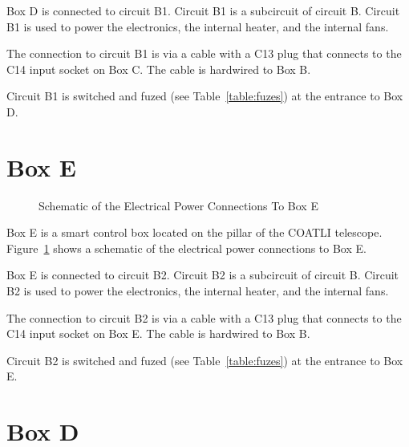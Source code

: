 Box D is connected to circuit B1. Circuit B1 is a subcircuit of circuit B. Circuit B1 is used to power the electronics, the internal heater, and the internal fans.

The connection to circuit B1 is via a cable with a C13 plug that connects to the C14 input socket on Box C. The cable is hardwired to Box B.

Circuit B1 is switched and fuzed (see Table~\ref{table:fuzes}) at the entrance to Box D.

\section{Box E}

\begin{figure}
\begin{center}
\footnotesize 
{}
\end{center}
\caption{Schematic of the Electrical Power Connections To Box E}
\label{figure:schematic-electrical-power-box-e}
\end{figure}

Box E is a smart control box located on the pillar of the COATLI telescope. Figure~\ref{figure:schematic-electrical-power-box-e} shows a schematic of the electrical power connections to Box E.

Box E is connected to circuit B2. Circuit B2 is a subcircuit of circuit B. Circuit B2 is used to power the electronics, the internal heater, and the internal fans.

The connection to circuit B2 is via a cable with a C13 plug that connects to the C14 input socket on Box E. The cable is hardwired to Box B.

Circuit B2 is switched and fuzed (see Table~\ref{table:fuzes}) at the entrance to Box E.

\fi

\ifddotioan

\section{Box D}

